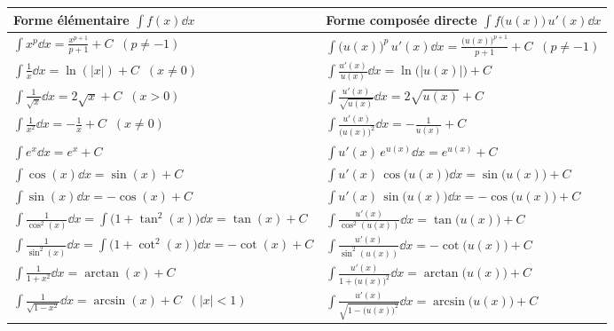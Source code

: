 \begin{theoreme}
\begin{center}
{\footnotesize
\renewcommand{\arraystretch}{1.65}
\setlength{\tabcolsep}{3pt}
\begin{tabular}{@{}ll@{}}
\toprule
\textbf{Forme élémentaire $\displaystyle\int f(x)\dd x$} & \textbf{Forme composée directe $\displaystyle\int f\bigl(u(x)\bigr)\,u'(x)\dd x$} \\
\midrule
$\displaystyle\int x^p\dd x = \frac{x^{p+1}}{p+1} + C \;\; (p \neq -1)$ & $\displaystyle\int \bigl(u(x)\bigr)^p\,u'(x)\dd x = \frac{\bigl(u(x)\bigr)^{p+1}}{p+1} + C \;\; (p \neq -1)$ \\
$\displaystyle\int \frac{1}{x}\dd x = \ln(|x|) + C \;\; (x \neq 0)$ & $\displaystyle\int \frac{u'(x)}{u(x)}\dd x = \ln\bigl(|u(x)|\bigr) + C$ \\
$\displaystyle\int \frac{1}{\sqrt{x}}\dd x = 2\sqrt{x} + C \;\; (x > 0)$ & $\displaystyle\int \frac{u'(x)}{\sqrt{u(x)}}\dd x = 2\sqrt{u(x)} + C$ \\
$\displaystyle\int \frac{1}{x^2}\dd x = -\frac{1}{x} + C \;\; (x \neq 0)$ & $\displaystyle\int \frac{u'(x)}{\bigl(u(x)\bigr)^2}\dd x = -\frac{1}{u(x)} + C$ \\
$\displaystyle\int e^x\dd x = e^x + C$ & $\displaystyle\int u'(x)\,e^{u(x)}\dd x = e^{u(x)} + C$ \\
$\displaystyle\int \cos(x)\dd x = \sin(x) + C$ & $\displaystyle\int u'(x)\,\cos\bigl(u(x)\bigr)\dd x = \sin\bigl(u(x)\bigr) + C$ \\
$\displaystyle\int \sin(x)\dd x = -\cos(x) + C$ & $\displaystyle\int u'(x)\,\sin\bigl(u(x)\bigr)\dd x = -\cos\bigl(u(x)\bigr) + C$ \\
$\displaystyle\int \frac{1}{\cos^2(x)}\dd x = \int \bigl(1+\tan^2(x)\bigr)\dd x = \tan(x) + C$ & $\displaystyle\int \frac{u'(x)}{\cos^2(u(x))}\dd x = \tan\bigl(u(x)\bigr) + C$ \\
$\displaystyle\int \frac{1}{\sin^2(x)}\dd x = \int \bigl(1+\cot^2(x)\bigr)\dd x = -\cot(x) + C$ & $\displaystyle\int \frac{u'(x)}{\sin^2(u(x))}\dd x = -\cot\bigl(u(x)\bigr) + C$ \\
$\displaystyle\int \frac{1}{1 + x^2}\dd x = \arctan(x) + C$ & $\displaystyle\int \frac{u'(x)}{1 + \bigl(u(x)\bigr)^2}\dd x = \arctan\bigl(u(x)\bigr) + C$ \\
$\displaystyle\int \frac{1}{\sqrt{1 - x^2}}\dd x = \arcsin(x) + C \;\; (|x| < 1)$ & $\displaystyle\int \frac{u'(x)}{\sqrt{1 - \bigl(u(x)\bigr)^2}}\dd x = \arcsin\bigl(u(x)\bigr) + C$ \\
\bottomrule
\end{tabular}
}
\end{center}
\end{theoreme}

